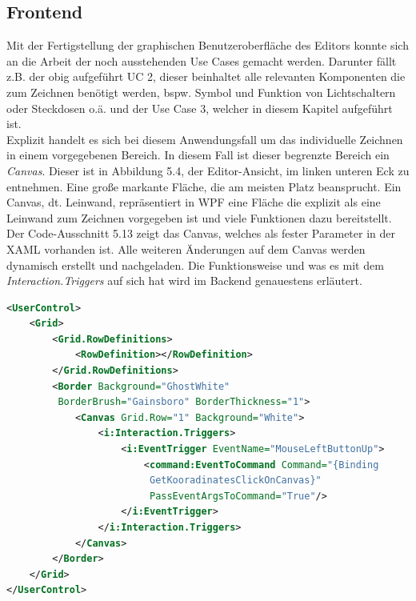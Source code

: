 \subsection{Frontend}
Mit der Fertigstellung der graphischen Benutzeroberfläche des Editors konnte sich an die Arbeit der noch ausstehenden Use Cases gemacht 
werden. Darunter fällt z.B. der obig aufgeführt UC 2, dieser beinhaltet alle relevanten Komponenten die zum Zeichnen 
benötigt werden, bspw. Symbol und Funktion von Lichtschaltern oder Steckdosen o.ä. und der Use Case 3, welcher in diesem Kapitel aufgeführt ist.
\\Explizit handelt es sich bei diesem Anwendungsfall um das individuelle Zeichnen in einem vorgegebenen Bereich. In diesem Fall ist dieser begrenzte 
Bereich ein \textit{Canvas}. Dieser ist in Abbildung 5.4, der Editor-Ansicht, im linken unteren Eck zu entnehmen. Eine große markante Fläche, die 
am meisten Platz beansprucht. Ein Canvas, dt. Leinwand, repräsentiert in \acs{WPF} eine Fläche die explizit als eine Leinwand zum Zeichnen vorgegeben ist und viele Funktionen dazu bereitstellt.
Der Code-Ausschnitt 5.13 zeigt das Canvas, welches als fester Parameter in der \acs{XAML} vorhanden ist. Alle weiteren Änderungen auf dem Canvas werden dynamisch 
erstellt und nachgeladen. Die Funktionsweise und was es mit dem \textit{Interaction.Triggers} auf sich hat wird im Backend genauestens erläutert.
\\
\begin{lstlisting}[language=XML,
    frame=single,           % Ein Rahmen um den Code
    framexleftmargin=15pt,  % Rahmen link von den Zahlen
    style=algoBericht,
    label={usercontrolsnippet},
    captionpos=b,           % Caption unter den Code setzen
caption={UserControl-Referenz Code-Ausschnitt}]
<UserControl>
    <Grid>
        <Grid.RowDefinitions>
            <RowDefinition></RowDefinition>
        </Grid.RowDefinitions>
        <Border Background="GhostWhite" 
         BorderBrush="Gainsboro" BorderThickness="1">
            <Canvas Grid.Row="1" Background="White">
                <i:Interaction.Triggers>
                    <i:EventTrigger EventName="MouseLeftButtonUp">
                        <command:EventToCommand Command="{Binding 
                         GetKooradinatesClickOnCanvas}" 
                         PassEventArgsToCommand="True"/>
                    </i:EventTrigger>
                </i:Interaction.Triggers>   
            </Canvas>
        </Border>
    </Grid>
</UserControl>
\end{lstlisting}
